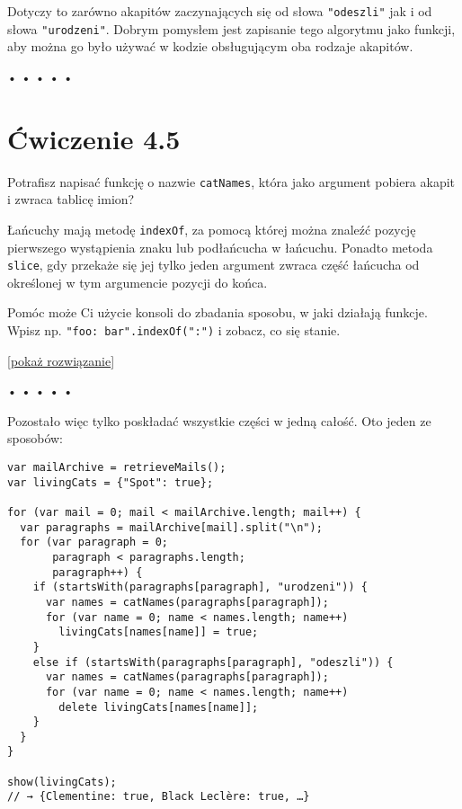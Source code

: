 Dotyczy to zarówno akapitów zaczynających się od słowa \texttt{"odeszli"} jak i od słowa \texttt{"urodzeni"}. Dobrym pomysłem jest zapisanie tego algorytmu jako funkcji, aby można go było używać w kodzie obsługującym oba rodzaje akapitów.

  
  
\begin{center}
• • • • •
\end{center}
  
    
\section*{Ćwiczenie 4.5}
\label{sec:4.5}
    
      
Potrafisz napisać funkcję o nazwie \texttt{catNames}, która jako argument pobiera akapit i zwraca tablicę imion?

      
Łańcuchy mają metodę \texttt{indexOf}, za pomocą której można znaleźć pozycję pierwszego wystąpienia znaku lub podłańcucha w łańcuchu. Ponadto metoda \texttt{slice}, gdy przekaże się jej tylko jeden argument zwraca część łańcucha od określonej w tym argumencie pozycji do końca.

      
Pomóc może Ci użycie konsoli do zbadania sposobu, w jaki działają funkcje. Wpisz np. \texttt{"foo: bar".indexOf(":")} i zobacz, co się stanie.

    
[\hyperref[sol:4.5]{pokaż rozwiązanie}]
    
    
  
  
\begin{center}
• • • • •
\end{center}
  
    
Pozostało więc tylko poskładać wszystkie części w jedną całość. Oto jeden ze sposobów:

    
\begin{verbatim} 
var mailArchive = retrieveMails();
var livingCats = {"Spot": true};

for (var mail = 0; mail < mailArchive.length; mail++) {
  var paragraphs = mailArchive[mail].split("\n");
  for (var paragraph = 0;
       paragraph < paragraphs.length;
       paragraph++) {
    if (startsWith(paragraphs[paragraph], "urodzeni")) {
      var names = catNames(paragraphs[paragraph]);
      for (var name = 0; name < names.length; name++)
        livingCats[names[name]] = true;
    }
    else if (startsWith(paragraphs[paragraph], "odeszli")) {
      var names = catNames(paragraphs[paragraph]);
      for (var name = 0; name < names.length; name++)
        delete livingCats[names[name]];
    }
  }
}

show(livingCats);
// → {Clementine: true, Black Leclère: true, …}
\end{verbatim}
    
